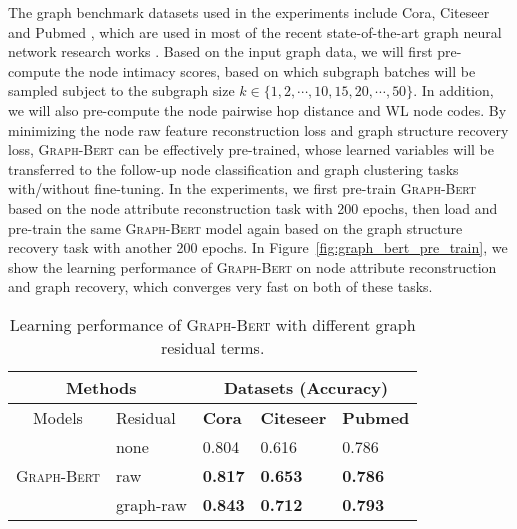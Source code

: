 \documentclass{article}
\newcommand{\our}{\textsc{Graph-Bert}}
\begin{document}
The graph benchmark datasets used in the experiments include Cora, Citeseer and Pubmed \cite{YCS16}, which are used in most of the recent state-of-the-art graph neural network research works \cite{Kipf_Semi_CORR_16,Velickovic_Graph_ICLR_18,Zhang2019GResNetGR}. Based on the input graph data, we will first pre-compute the node intimacy scores, based on which subgraph batches will be sampled subject to the subgraph size $k \in \{1, 2, \cdots, 10, 15, 20, \cdots, 50\}$. In addition, we will also pre-compute the node pairwise hop distance and WL node codes. By minimizing the node raw feature reconstruction loss and graph structure recovery loss, {\our} can be effectively pre-trained, whose learned variables will be transferred to the follow-up node classification and graph clustering tasks with/without fine-tuning. In the experiments, we first pre-train {\our} based on the node attribute reconstruction task with 200 epochs, then load and pre-train the same {\our} model again based on the graph structure recovery task with another 200 epochs. In Figure~\ref{fig:graph_bert_pre_train}, we show the learning performance of {\our} on node attribute reconstruction and graph recovery, which converges very fast on both of these tasks.




\begin{table}[t]
\caption{Learning performance of {\our} with different graph residual terms.}\label{tab:graph_residual}
 \small
\centering
\setlength{\tabcolsep}{3.5pt}
\begin{tabular}{|c|l|p{1.2cm}|p{1.2cm}|p{1.2cm}|}
\hline
\multicolumn{2}{|c}{Methods } & \multicolumn{3}{|c|}{Datasets (Accuracy)} \\
\hline
Models & Residual & {\textbf{Cora}} & {\textbf{Citeseer}} & {\textbf{Pubmed}} \\
\hline 
\hline 
\multirow{3}{*}{{\our}}
&none &0.804   &{0.616}  &0.786   \\
\cline{2-5}
&raw&\textbf{0.817}  &\textbf{0.653}  &\textbf{0.786}   \\
\cline{2-5}
&graph-raw&\textbf{0.843}   &\textbf{0.712}  &\textbf{0.793}  \\
\hline
\end{tabular}
\end{table}
\end{document}
